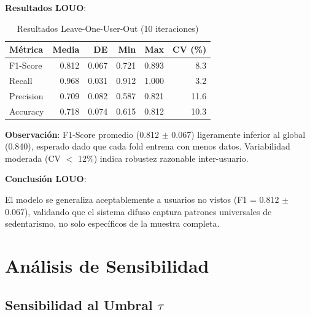 \documentclass[12pt,letterpaper,twoside]{report}
\begin{document}
\begin{calculobox}
\textbf{Resultados LOUO}:

\begin{table}[H]
\centering
\caption{Resultados Leave-One-User-Out (10 iteraciones)}
\label{tab:louo_results}
\begin{tabular}{@{}lrrrrr@{}}
\toprule
\textbf{Métrica} & \textbf{Media} & \textbf{DE} & \textbf{Min} & \textbf{Max} & \textbf{CV (\%)} \\
\midrule
F1-Score         & 0.812 & 0.067 & 0.721 & 0.893 & 8.3 \\
Recall           & 0.968 & 0.031 & 0.912 & 1.000 & 3.2 \\
Precision        & 0.709 & 0.082 & 0.587 & 0.821 & 11.6 \\
Accuracy         & 0.718 & 0.074 & 0.615 & 0.812 & 10.3 \\
\bottomrule
\end{tabular}
\end{table}

\textbf{Observación}: F1-Score promedio (0.812 $\pm$ 0.067) ligeramente inferior al global (0.840), esperado dado que cada fold entrena con menos datos. Variabilidad moderada (CV $<$ 12\%) indica robustez razonable inter-usuario.
\end{calculobox}

\begin{decisionbox}
\textbf{Conclusión LOUO}:

El modelo se generaliza aceptablemente a usuarios no vistos (F1 = 0.812 $\pm$ 0.067), validando que el sistema difuso captura patrones universales de sedentarismo, no solo específicos de la muestra completa.
\end{decisionbox}

\section{Análisis de Sensibilidad}

\subsection{Sensibilidad al Umbral $\tau$}
\end{document}
